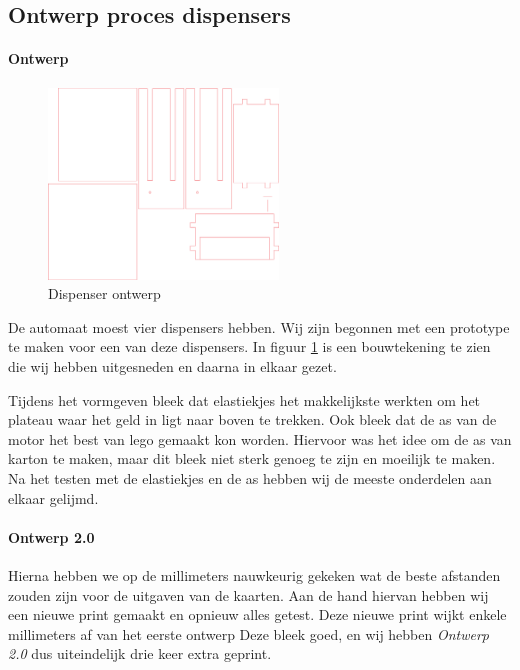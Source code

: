 \documentclass{article}
\begin{document}
\subsection{Ontwerp proces dispensers}

\paragraph{Ontwerp}

\begin{figure}[H]
       \centering
       \includegraphics[height=2.0in]{dispenser.pdf}
       \caption{Dispenser ontwerp}
       \label{fig: Dispenser ontwerp}
\end{figure}

De automaat moest vier dispensers hebben.
Wij zijn begonnen met een prototype te maken voor een van deze dispensers.
In figuur \ref{fig: Dispenser ontwerp} is een bouwtekening te zien die wij hebben uitgesneden en daarna in elkaar gezet.

Tijdens het vormgeven bleek dat elastiekjes het makkelijkste werkten om het plateau waar het geld in ligt naar boven te trekken.
Ook bleek dat de as van de motor het best van lego gemaakt kon worden.
Hiervoor was het idee om de as van karton te maken, maar dit bleek niet sterk genoeg te zijn en moeilijk te maken.
Na het testen met de elastiekjes en de as hebben wij de meeste onderdelen aan elkaar gelijmd.

\paragraph{Ontwerp 2.0}

Hierna hebben we op de millimeters nauwkeurig gekeken wat de beste afstanden zouden zijn voor de uitgaven van de kaarten.
Aan de hand hiervan hebben wij een nieuwe print gemaakt en opnieuw alles getest.
Deze nieuwe print wijkt enkele millimeters af van het eerste ontwerp
Deze bleek goed, en wij hebben \emph{Ontwerp 2.0} dus uiteindelijk drie keer extra geprint.
\end{document}
